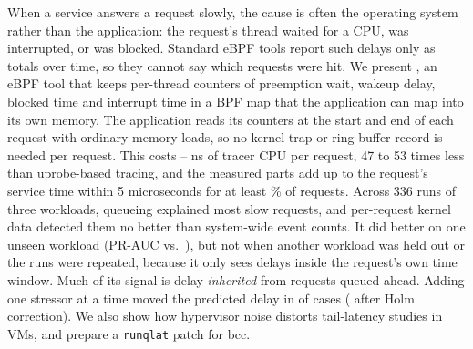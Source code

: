 When a service answers a request slowly, the cause is often the operating
system rather than the application: the request's thread waited for a CPU,
was interrupted, or was blocked. Standard eBPF tools report such delays only
as totals over time, so they cannot say which requests were hit. We present
\sys{}, an eBPF tool that keeps per-thread counters of preemption wait,
wakeup delay, blocked time and interrupt time in a BPF map that the
application can map into its own memory. The application reads its counters
at the start and end of each request with ordinary memory loads, so no
kernel trap or ring-buffer record is needed per request. This costs
\ovNsKvShm--\ovNsCpuShm{} ns of tracer CPU per request, 47 to 53 times less
than uprobe-based tracing, and the measured parts add up to the request's
service time within 5 microseconds for at least \valWithin\% of requests. Across
336 runs of three workloads, queueing explained most slow requests, and
per-request kernel data detected them no better than system-wide event
counts. It did better on one unseen workload (PR-AUC \apAlLHeld{} vs.\
\apAgLHeld), but not when another workload was held out or the runs were
repeated, because it only sees delays inside the request's own time window.
Much of its signal is delay \emph{inherited} from requests queued ahead.
Adding one stressor at a time moved the predicted delay in \hTwoRaw{} of
\hTwoN{} cases (\hTwoHolm{} after Holm correction). We also show how
hypervisor noise distorts tail-latency studies in VMs, and prepare a
\texttt{runqlat} patch for bcc.
